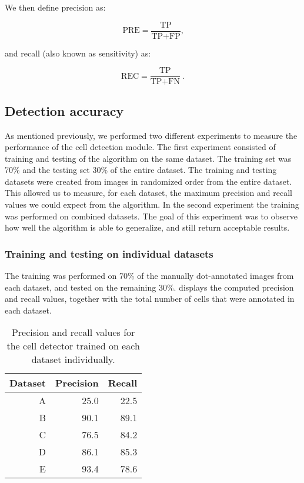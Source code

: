 	We then define precision as:
	
	\[
		\text{PRE} = \frac{\text{TP}}{\text{TP}+\text{FP}}\text{,}
	\]
	
	\noindent and recall (also known as sensitivity) as:
	
	\[
		\text{REC} = \frac{\text{TP}}{\text{TP} + \text{FN}}\ \text{.}
	\]
	
	\subsection{Detection accuracy \statusfirstdraft}
			
		As mentioned previously, we performed two different experiments to measure the performance of the cell detection module. The first experiment consisted of training and testing of the algorithm on the same dataset. The training set was 70\% and the testing set 30\% of the entire dataset. The training and testing datasets were created from images in randomized order from the entire dataset. This allowed us to measure, for each dataset, the maximum precision and recall values we could expect from the algorithm. In the second experiment the training was performed on combined datasets. The goal of this experiment was to observe how well the algorithm is able to generalize, and still return acceptable results.
		
		\subsubsection{Training and testing on individual datasets}
		
		The training was performed on 70\% of the manually dot-annotated images from each dataset, and tested on the remaining 30\%.  displays the computed precision and recall values, together with the total number of cells that were annotated in each dataset.
		
		
		\begin{table}[h]
			\centering
			\begin{tabular}{rrr}
				Dataset & Precision & Recall \\
				\hline
				      A &      25.0 &   22.5 \\
				      B &      90.1 &   89.1 \\
				      C &      76.5 &   84.2 \\
				      D &      86.1 &   85.3 \\
				      E &      93.4 &   78.6
			\end{tabular} 
			\caption{Precision and recall values for the cell detector trained on each dataset individually.}
			\label{tab:results_detector_individual}
		\end{table}
		
